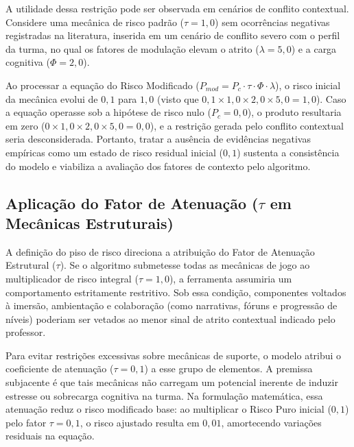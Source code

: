 A utilidade dessa restrição pode ser observada em cenários de conflito contextual. Considere uma mecânica de risco padrão ($\tau = 1,0$) sem ocorrências negativas registradas na literatura, inserida em um cenário de conflito severo com o perfil da turma, no qual os fatores de modulação elevam o atrito ($\lambda = 5,0$) e a carga cognitiva ($\Phi = 2,0$).

Ao processar a equação do Risco Modificado ($P_{mod} = P_c \cdot \tau \cdot \Phi \cdot \lambda$), o risco inicial da mecânica evolui de $0,1$ para $1,0$ (visto que $0,1 \times 1,0 \times 2,0 \times 5,0 = 1,0$). Caso a equação operasse sob a hipótese de risco nulo ($P_c = 0,0$), o produto resultaria em zero ($0 \times 1,0 \times 2,0 \times 5,0 = 0,0$), e a restrição gerada pelo conflito contextual seria desconsiderada. Portanto, tratar a ausência de evidências negativas empíricas como um estado de risco residual inicial ($0,1$) sustenta a consistência do modelo e viabiliza a avaliação dos fatores de contexto pelo algoritmo.

\subsection{Aplicação do Fator de Atenuação ($\tau$ em Mecânicas Estruturais)}

A definição do piso de risco direciona a atribuição do Fator de Atenuação Estrutural ($\tau$). Se o algoritmo submetesse todas as mecânicas de jogo ao multiplicador de risco integral ($\tau = 1,0$), a ferramenta assumiria um comportamento estritamente restritivo. Sob essa condição, componentes voltados à imersão, ambientação e colaboração (como narrativas, fóruns e progressão de níveis) poderiam ser vetados ao menor sinal de atrito contextual indicado pelo professor.

Para evitar restrições excessivas sobre mecânicas de suporte, o modelo atribui o coeficiente de atenuação ($\tau = 0,1$) a esse grupo de elementos. A premissa subjacente é que tais mecânicas não carregam um potencial inerente de induzir estresse ou sobrecarga cognitiva na turma. Na formulação matemática, essa atenuação reduz o risco modificado base: ao multiplicar o Risco Puro inicial ($0,1$) pelo fator $\tau = 0,1$, o risco ajustado resulta em $0,01$, amortecendo variações residuais na equação.

